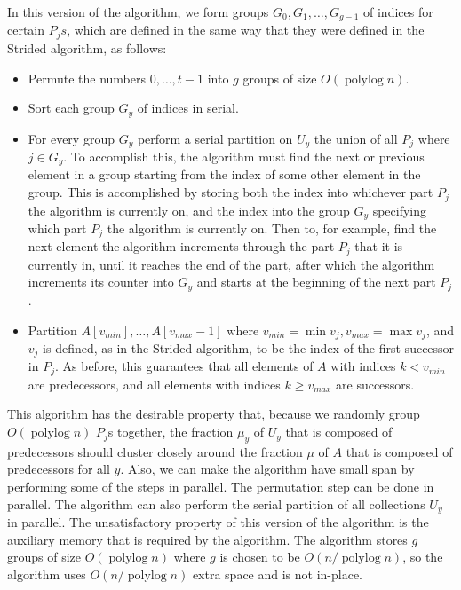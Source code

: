 \documentclass[twocolumn, twoside, 11pt]{article}
\def\polylog{\operatorname{polylog}}
\renewcommand{\paragraph}[1]{\vspace{0.09in}\noindent{\bf \boldmath #1.}}
\begin{document}
\paragraph{Version 1}
In this version of the algorithm, we form groups $G_0,G_1,\ldots,G_{g-1}$ of indices for certain $P_js$, which are defined in the same way that they were defined in the Strided algorithm, as follows:
\begin{itemize}
	\item Permute the numbers $0,\ldots, t-1$ into $g$ groups of size $O(\polylog n)$.
	\item Sort each group $G_y$ of indices in serial. 
	\item For every group $G_y$ perform a serial partition on $U_y$ the union of all $P_j$ where $j \in G_y$. To accomplish this, the algorithm must find the next or previous element in a group starting from the index of some other element in the group. This is accomplished by storing both the index into whichever part $P_j$ the algorithm is currently on, and the index into the group $G_y$ specifying which part $P_j$ the algorithm is currently on. Then to, for example, find the next element the algorithm increments through the part $P_j$ that it is currently in, until it reaches the end of the part, after which the algorithm increments its counter into $G_y$ and starts at the beginning of the next part $P_j$.
	\item Partition $A[v_{min}], \ldots, A[v_{max}-1]$ where $v_{min}=\min{v_j}, v_{max}=\max{v_j}$, and $v_j$ is defined, as in the Strided algorithm, to be the index of the first successor in $P_j$. As before, this guarantees that all elements of $A$ with indices $k<v_{min}$ are predecessors, and all elements with indices $k\geq v_{max}$ are successors.
\end{itemize}
This algorithm has the desirable property that, because we randomly group $O(\polylog n)$ $P_j$s together, the fraction $\mu_y$ of $U_y$ that is composed of predecessors should cluster closely around the fraction $\mu$ of $A$ that is composed of predecessors for all $y$.
Also, we can make the algorithm have small span by performing some of the steps in parallel.
The permutation step can be done in parallel. 
The algorithm can also perform the serial partition of all collections $U_y$ in parallel.
The unsatisfactory property of this version of the algorithm is the auxiliary memory that is required by the algorithm.
The algorithm stores $g$ groups of size $O(\polylog n)$ where $g$ is chosen to be $O(n / \polylog n)$, so the algorithm uses $O(n / \polylog n)$ extra space and is not in-place.
\end{document}
